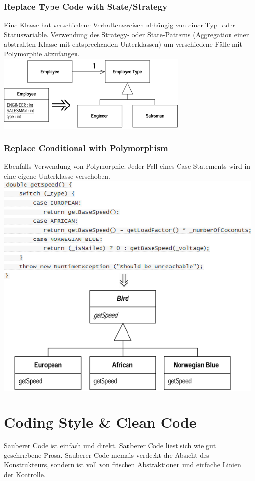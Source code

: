 \documentclass[a4paper,10pt]{article}
\begin{document}
\subsubsection{Replace Type Code with State/Strategy}
Eine Klasse hat verschiedene Verhaltensweisen abh\"{a}ngig von einer Typ- oder Statusvariable. Verwendung des Strategy- oder State-Patterns (Aggregation einer abstrakten Klasse mit entsprechenden Unterklassen) um verschiedene F\"{a}lle mit Polymorphie abzufangen.\\
\includegraphics[scale=.6]{refactoring_5.png}
\subsubsection{Replace Conditional with Polymorphism}
Ebenfalls Verwendung von Polymorphie. Jeder Fall eines Case-Statements wird in eine eigene Unterklasse verschoben.\\
\includegraphics[scale=.6]{refactoring_6.png}

\pagebreak
\section{Coding Style \& Clean Code}
Sauberer Code ist einfach und direkt. Sauberer Code liest sich wie gut geschriebene Prosa. Sauberer Code niemals verdeckt die Absicht des Konstrukteurs, sondern ist voll von frischen Abstraktionen und einfache Linien der Kontrolle. \\
\end{document}
